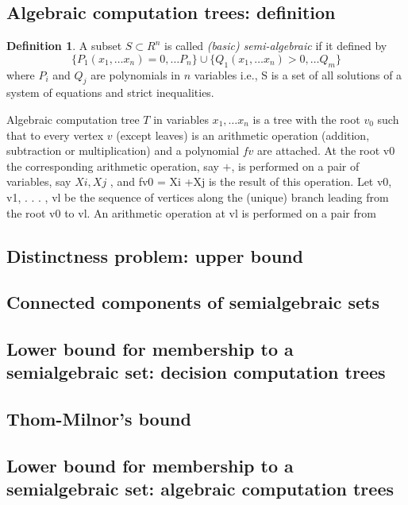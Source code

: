 \documentclass{article}
\theoremstyle{definition}
\newtheorem{definition}{Definition}[section]
\begin{document}

\subsection{Algebraic computation trees: definition}
\begin{definition}
    A subset $S \subset R^n$ is called \textit{(basic) semi-algebraic} if it defined by
    $$\{P_1(x_1,\dots x_n) = 0,\dots P_n\}
    \cup
    \{Q_1(x_1,\dots x_n) > 0,\dots Q_m\}$$
    where $P_i$ and $Q_j$ are polynomials in $n$ variables
    i.e., S is a set of all solutions of a system of equations and strict inequalities.
\end{definition}

Algebraic computation tree $T$ in variables $x_1,\dots x_n$
is a tree with the root $v_0$ such that to every vertex $v$ (except leaves) 
is an arithmetic operation (addition, subtraction or multiplication) 
and a polynomial $fv$ are attached. 
At the root v0 the corresponding arithmetic operation, say $+$,
is performed on a pair of variables, say $Xi, Xj$ , and fv0 = Xi +Xj is the result of this operation.
Let v0, v1, . . . , vl be the sequence of vertices along the (unique) branch leading from the root v0 to vl.
An arithmetic operation at vl is performed on a pair from

\subsection{Distinctness problem: upper bound}
\subsection{Connected components of semialgebraic sets}
\subsection{Lower bound for membership to a semialgebraic set: decision computation trees}
\subsection{Thom-Milnor’s bound}
\subsection{Lower bound for membership to a semialgebraic set: algebraic computation trees}
\end{document}
